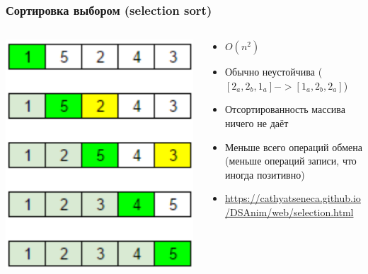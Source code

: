 \documentclass[xetex,mathserif,serif]{beamer}
\begin{document}
	\begin{frame}
		\frametitle{Сортировка выбором (selection sort)}
		\begin{columns}
			\begin{column}{0.25\textwidth}
				\includegraphics[width=\textwidth]{selectSort.png}
			\end{column}
			\begin{column}{0.75\textwidth}
				\begin{itemize}
					\item $O(n^2)$
					\item Обычно неустойчива ($[2_a, 2_b, 1_a] -> [1_a, 2_b, 2_a]$)
					\item Отсортированность массива ничего не даёт
					\item Меньше всего операций обмена (меньше операций записи, что иногда позитивно)
					\item \url{https://cathyatseneca.github.io/DSAnim/web/selection.html}
				\end{itemize}
			\end{column}
		\end{columns}
	\end{frame}
\end{document}
